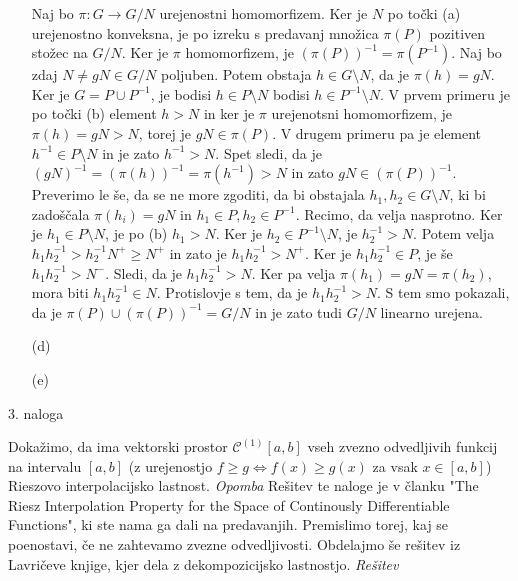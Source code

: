 \documentclass[a4paper, 12pt]{article}
\begin{document}
\begin{enumerate}
Naj bo $\pi : G\rightarrow G/N$ urejenostni homomorfizem. Ker je $N$ po točki (a) urejenostno konveksna, je po izreku s predavanj množica $\pi(P)$ pozitiven stožec na $G/N$. Ker je $\pi$ homomorfizem, je $(\pi(P))^{-1} = \pi (P^{-1})$. Naj bo zdaj $N\neq gN \in G/N$ poljuben. Potem obstaja $h \in G\setminus N$, da je $\pi(h) = gN$. Ker je $G= P\cup P^{-1}$, je bodisi $h\in P\setminus N$ bodisi $h\in P^{-1} \setminus N$. V prvem primeru je po točki (b) element $h> N$ in ker je $\pi$ urejenotsni homomorfizem, je $\pi(h) = gN > N$, torej je $gN \in \pi(P)$. V drugem primeru pa je element $h^{-1} \in P\setminus N$ in je zato $h^{-1}> N$. Spet sledi, da je $(gN)^{-1} = (\pi(h))^{-1} = \pi(h^{-1}) > N$ in zato $gN \in (\pi(P))^{-1}$. Preverimo le še, da se ne more zgoditi, da bi obstajala $h_1,h_2\in G\setminus N$, ki bi zadoščala $\pi(h_i) = gN$ in $h_1 \in P, h_2 \in P^{-1}$. Recimo, da velja nasprotno. Ker je $h_1 \in P\setminus N$, je po (b) $h_1 > N$. Ker je $h_2 \in P^{-1}\setminus N$, je $h_2^{-1} > N$. Potem velja $h_1 h_2^{-1} > h_2^{-1} N^+ \ge N^+$ in zato je $h_1 h_2^{-1}> N^+$. Ker je $h_1h_2^{-1}\in P$, je še $h_1 h_2^{-1} > N^-$. Sledi, da je $h_1 h_2^{-1}>N$. Ker pa velja $\pi(h_1) = gN = \pi(h_2)$, mora biti $h_1 h_2^{-1}\in N$. Protislovje s tem, da je $h_1h_2^{-1}>N$. S tem smo pokazali, da je $\pi(P) \cup (\pi(P))^{-1} = G/N$ in je zato tudi $G/N$ linearno urejena.

\item[(d)]
\item[(e)]
\end{enumerate}

\begin{flushleft}
3. naloga
\end{flushleft}
Dokažimo, da ima vektorski prostor $\mathcal{C}^{(1)} [a,b]$ vseh zvezno odvedljivih funkcij na intervalu $[a,b]$ (z urejenostjo $f\ge g \Leftrightarrow f(x) \ge g(x)$ za vsak $x\in [a,b]$) Rieszovo interpolacijsko lastnost.
\newline
\emph{Opomba}
\newline
Rešitev te naloge je v članku "The Riesz Interpolation Property for the Space of Continously Differentiable Functions", ki ste nama ga dali na predavanjih. 
Premislimo torej, kaj se poenostavi, če ne zahtevamo zvezne odvedljivosti. Obdelajmo še rešitev iz Lavričeve knjige, kjer dela z dekompozicijsko lastnostjo.
\newline
\emph{Rešitev}
\end{document}
